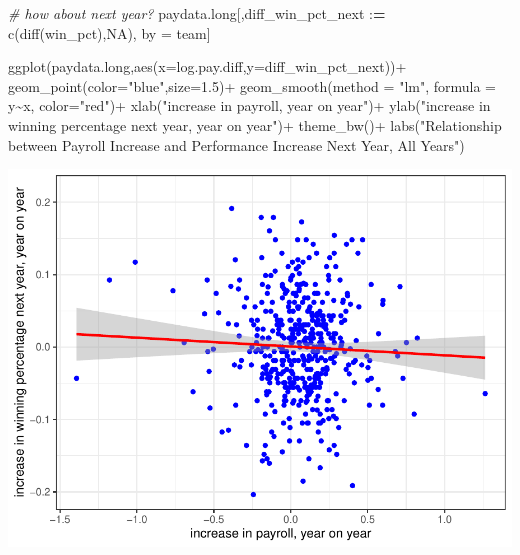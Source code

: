 \documentclass[
  12pt,
]{article}
\newenvironment{Shaded}{\begin{snugshade}}{\end{snugshade}}
\newcommand{\AttributeTok}[1]{\textcolor[rgb]{0.77,0.63,0.00}{#1}}
\newcommand{\CommentTok}[1]{\textcolor[rgb]{0.56,0.35,0.01}{\textit{#1}}}
\newcommand{\ConstantTok}[1]{\textcolor[rgb]{0.00,0.00,0.00}{#1}}
\newcommand{\ErrorTok}[1]{\textcolor[rgb]{0.64,0.00,0.00}{\textbf{#1}}}
\newcommand{\FloatTok}[1]{\textcolor[rgb]{0.00,0.00,0.81}{#1}}
\newcommand{\FunctionTok}[1]{\textcolor[rgb]{0.00,0.00,0.00}{#1}}
\newcommand{\NormalTok}[1]{#1}
\newcommand{\OtherTok}[1]{\textcolor[rgb]{0.56,0.35,0.01}{#1}}
\newcommand{\SpecialCharTok}[1]{\textcolor[rgb]{0.00,0.00,0.00}{#1}}
\newcommand{\StringTok}[1]{\textcolor[rgb]{0.31,0.60,0.02}{#1}}
\begin{document}
\begin{Shaded}
\begin{Highlighting}[]
\CommentTok{\# how about next year?}
\NormalTok{paydata.long[,diff\_win\_pct\_next }\SpecialCharTok{:}\ErrorTok{=} \FunctionTok{c}\NormalTok{(}\FunctionTok{diff}\NormalTok{(win\_pct),}\ConstantTok{NA}\NormalTok{), by }\OtherTok{=}\NormalTok{ team]}

\FunctionTok{ggplot}\NormalTok{(paydata.long,}\FunctionTok{aes}\NormalTok{(}\AttributeTok{x=}\NormalTok{log.pay.diff,}\AttributeTok{y=}\NormalTok{diff\_win\_pct\_next))}\SpecialCharTok{+}
  \FunctionTok{geom\_point}\NormalTok{(}\AttributeTok{color=}\StringTok{"blue"}\NormalTok{,}\AttributeTok{size=}\FloatTok{1.5}\NormalTok{)}\SpecialCharTok{+}
  \FunctionTok{geom\_smooth}\NormalTok{(}\AttributeTok{method =} \StringTok{"lm"}\NormalTok{, }\AttributeTok{formula =}\NormalTok{ y}\SpecialCharTok{\textasciitilde{}}\NormalTok{x, }\AttributeTok{color=}\StringTok{"red"}\NormalTok{)}\SpecialCharTok{+}
  \FunctionTok{xlab}\NormalTok{(}\StringTok{"increase in payroll, year on year"}\NormalTok{)}\SpecialCharTok{+}
  \FunctionTok{ylab}\NormalTok{(}\StringTok{"increase in winning percentage next year, year on year"}\NormalTok{)}\SpecialCharTok{+}
  \FunctionTok{theme\_bw}\NormalTok{()}\SpecialCharTok{+}
  \FunctionTok{labs}\NormalTok{(}\StringTok{"Relationship between Payroll Increase and Performance Increase Next Year, All Years"}\NormalTok{)}
\end{Highlighting}
\end{Shaded}

\includegraphics{hw1_sol_files/figure-latex/unnamed-chunk-16-3.pdf}
\end{document}
